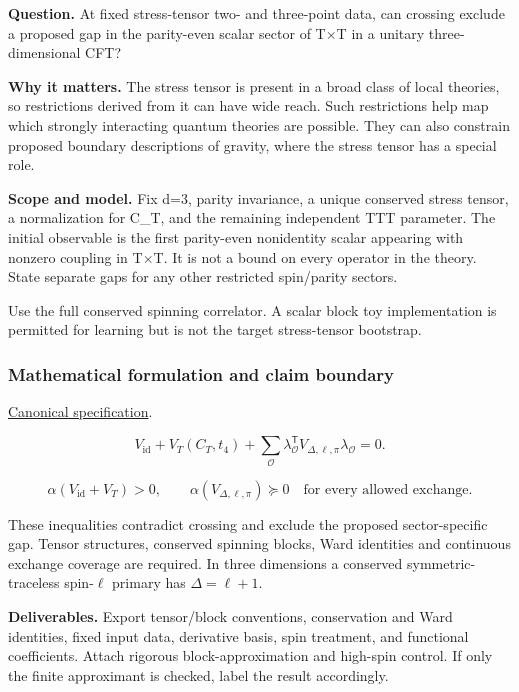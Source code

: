 \documentclass[
  11pt,
]{article}
\begin{document}
\textbf{Question.} At fixed stress-tensor two- and three-point data, can
crossing exclude a proposed gap in the parity-even scalar sector of
T\ensuremath{\times}T in a unitary three-dimensional CFT?

\textbf{Why it matters.} The stress tensor is present in a broad class
of local theories, so restrictions derived from it can have wide reach.
Such restrictions help map which strongly interacting quantum theories
are possible. They can also constrain proposed boundary descriptions of
gravity, where the stress tensor has a special role.

\textbf{Scope and model.} Fix d=3, parity invariance, a unique conserved
stress tensor, a normalization for C\_T, and the remaining independent
TTT parameter. The initial observable is the first parity-even
nonidentity scalar appearing with nonzero coupling in
T\ensuremath{\times}T. It is not a bound on every operator in the
theory. State separate gaps for any other restricted spin/parity
sectors.

Use the full conserved spinning correlator. A scalar block toy
implementation is permitted for learning but is not the target
stress-tensor bootstrap.

\subsubsection{Mathematical formulation and claim boundary}

\href{https://github.com/rick-stevens-ai/Pure-Thought/blob/main/PRDs/07-Extremal-CFTs-Stress-Tensor.md}{Canonical
specification}.

\[V_{\mathrm{id}}+V_T(C_T,t_4)+
\sum_{\mathcal O}\lambda_{\mathcal O}^{\mathsf T}V_{\Delta,\ell,\pi}
\lambda_{\mathcal O}=0.\]

\[\alpha(V_{\mathrm{id}}+V_T)>0,\qquad
\alpha(V_{\Delta,\ell,\pi})\succeq0
\quad\text{for every allowed exchange}.\]

These inequalities contradict crossing and exclude the proposed
sector-specific gap. Tensor structures, conserved spinning blocks, Ward
identities and continuous exchange coverage are required. In three
dimensions a conserved symmetric-traceless spin-\(\ell\) primary has
\(\Delta=\ell+1\).

\textbf{Deliverables.} Export tensor/block conventions, conservation and
Ward identities, fixed input data, derivative basis, spin treatment, and
functional coefficients. Attach rigorous block-approximation and
high-spin control. If only the finite approximant is checked, label the
result accordingly.
\end{document}
